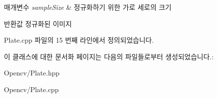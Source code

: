 \begin{DoxyParams}{매개변수}
{\em sample\+Size} & 정규화하기 위한 가로 세로의 크기 \\
\hline
\end{DoxyParams}
\begin{DoxyReturn}{반환값}
정규화된 이미지 
\end{DoxyReturn}


Plate.\+cpp 파일의 15 번째 라인에서 정의되었습니다.



이 클래스에 대한 문서화 페이지는 다음의 파일들로부터 생성되었습니다.\+:\begin{DoxyCompactItemize}
\item 
Opencv/Plate.\+hpp\item 
Opencv/Plate.\+cpp\end{DoxyCompactItemize}
